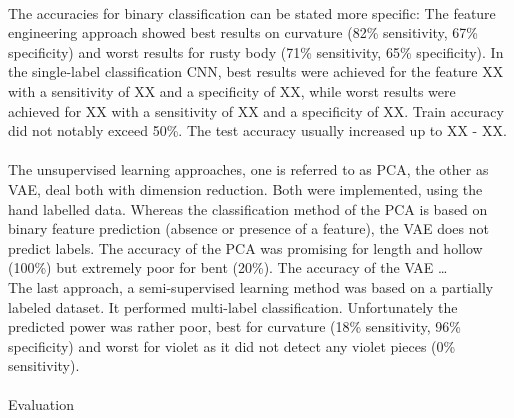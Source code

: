 \\
The accuracies for binary classification can be stated more specific: The feature engineering approach showed best results on curvature (82\% sensitivity, 67\% specificity) and worst results for rusty body (71\% sensitivity, 65\% specificity). In the single-label classification CNN, best results were achieved for the feature XX with a sensitivity of XX and a specificity of XX, while worst results were achieved for XX with a sensitivity of XX and a specificity of XX. Train accuracy did not notably exceed 50\%. The test accuracy usually increased up to XX - XX. \\
\\
The unsupervised learning approaches, one is referred to as PCA, the other as VAE, deal both with dimension reduction. Both were implemented, using the hand labelled data. Whereas the classification method of the PCA is based on binary feature prediction (absence or presence of a feature), the VAE does not predict labels. The accuracy of the PCA was promising for length and hollow (100\%) but extremely poor for bent (20\%). The accuracy of the VAE … \\
The last approach, a semi-supervised learning method was based on a partially labeled dataset. It performed multi-label classification. Unfortunately the predicted power was rather poor, best for curvature (18\% sensitivity, 96\% specificity) and worst for violet as it did not detect any violet pieces (0\% sensitivity). \\
\\
Evaluation 


